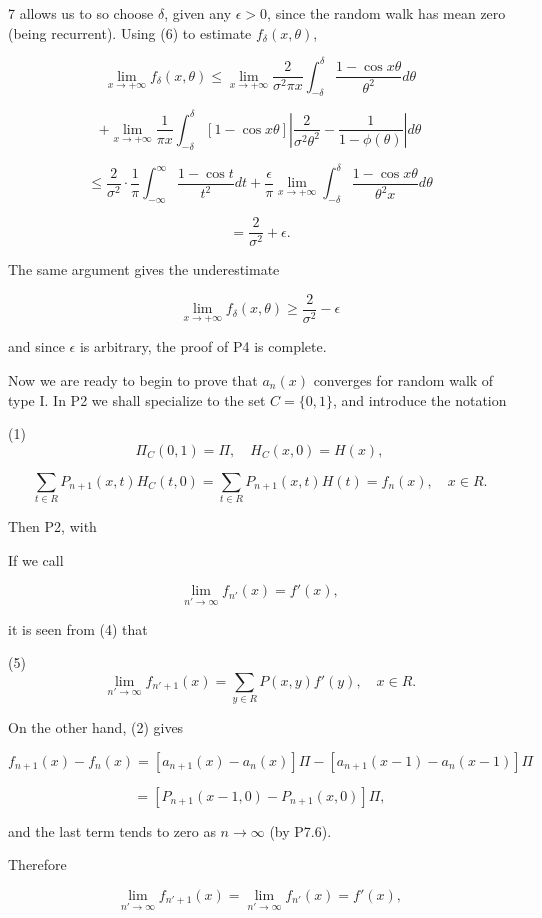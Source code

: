 7 allows us to so choose $\delta$, given any $\epsilon > 0$, since the random walk has mean zero (being recurrent). Using (6) to estimate $f_{\delta}(x, \theta)$,

$$\lim_{x \to +\infty} f_{\delta}(x, \theta) \leq \lim_{x \to +\infty} \frac{2}{\sigma^2 \pi x} \int_{-\delta}^{\delta} \frac{1 - \cos x \theta}{\theta^2} d\theta$$

$$+ \lim_{x \to +\infty} \frac{1}{\pi x} \int_{-\delta}^{\delta} [1 - \cos x \theta] \left| \frac{2}{\sigma^2 \theta^2} - \frac{1}{1 - \phi(\theta)} \right| d\theta$$

$$\leq \frac{2}{\sigma^2} \cdot \frac{1}{\pi} \int_{-\infty}^{\infty} \frac{1 - \cos t}{t^2} dt + \frac{\epsilon}{\pi} \lim_{x \to +\infty} \int_{-\delta}^{\delta} \frac{1 - \cos x \theta}{\theta^2 x} d\theta$$

$$= \frac{2}{\sigma^2} + \epsilon.$$

The same argument gives the underestimate

$$\lim_{x \to +\infty} f_{\delta}(x, \theta) \geq \frac{2}{\sigma^2} - \epsilon$$

and since $\epsilon$ is arbitrary, the proof of P4 is complete.

Now we are ready to begin to prove that $a_n(x)$ converges for random walk of type I. In P2 we shall specialize to the set $C = \{0, 1\}$, and introduce the notation

(1) $$\Pi_C(0, 1) = \Pi, \quad H_C(x, 0) = H(x),$$

$$\sum_{t \in R} P_{n+1}(x, t) H_C(t, 0) = \sum_{t \in R} P_{n+1}(x, t) H(t) = f_n(x), \quad x \in R.$$

Then P2, with

If we call

$$\lim_{n' \to \infty} f_{n'}(x) = f'(x),$$

it is seen from (4) that

(5) $$\lim_{n' \to \infty} f_{n'+1}(x) = \sum_{y \in R} P(x,y)f'(y), \quad x \in R.$$

On the other hand, (2) gives

$$f_{n+1}(x) - f_n(x) = [a_{n+1}(x) - a_n(x)]\Pi - [a_{n+1}(x-1) - a_n(x-1)]\Pi$$

$$= [P_{n+1}(x-1,0) - P_{n+1}(x,0)]\Pi,$$

and the last term tends to zero as $n \to \infty$ (by P7.6).

Therefore

$$\lim_{n' \to \infty} f_{n'+1}(x) = \lim_{n' \to \infty} f_{n'}(x) = f'(x),$$


